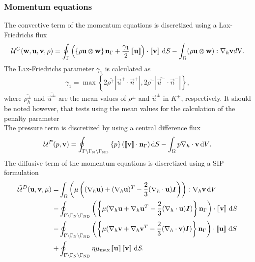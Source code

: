 \subsubsection{Momentum equations}
The convective term of the momentum equations is discretized using a Lax-Friedrichs flux
\begin{equation}
	\mathcal{U}^C(\textbf{w},\textbf{u},\textbf{v}, \rho)=  \oint_{\Gamma}{\left( \left\{{\rho\textbf{u}\otimes\textbf{w} }\right\}\textbf{n}_\Gamma + \frac{\gamma_1}{2}\left[\!\left[{{\textbf{u}}}\right]\!\right]\right)\cdot\left[\!\left[{{\textbf{v}}}\right]\!\right] \,\mathrm{d} S}
	-\int_{\Omega}({\rho\textbf{u}\otimes\textbf{w}}):\nabla_h\textbf{v} d\text{V}.
	\label{eq:Mom_convective}\\
\end{equation}
The Lax-Friedrichs parameter $\gamma_1$ is calculated as \textcite{kleinHighorderDiscontinuousGalerkin2016}
\begin{equation}
	\gamma_1  = \max \left\{2 \overline{\rho^+} |\overline{\vec{u}^+} \cdot \vec{n}^+|,2 \overline{\rho^-} |\overline{\vec{u}^-} \cdot \vec{n}^-|\right\},
	\label{eq:vardens_lambda}
\end{equation}
where $\overline{\rho_{h}^\pm}$ and $\overline{\vec{u}^\pm}$ are the mean values of $\rho^\pm$ and $\vec{u}^\pm$ in $K^\pm$, respectively. It should be noted however, that tests using the mean values for the calculation of the penalty parameter\\
The pressure term is discretized by using a central difference flux
\begin{equation}
	\mathcal{U}^P(p,\textbf{v})=  \oint_{\Gamma \setminus \Gamma_{\text{N}}\setminus \Gamma_{\text{ND}}}{ \left\{{p}\right\}(\left[\!\left[{{\textbf{v}}}\right]\!\right]\cdot \textbf{n}_\Gamma  )\,\mathrm{d} S}
	- \int_{\Omega}{p \nabla_h \cdot \textbf{v} \,\mathrm{d} V}. \label{eq:Mom_pressure}
\end{equation}
The diffusive term of the momentum equations is discretized using a \gls{SIP} formulation \parencite{shahbaziExplicitExpressionPenalty2005}
\begin{equation}
	\begin{aligned}
		\tilde{\mathcal{U}}^D(\vec{u},\vec{v},\mu) =
		  & \int_{\Omega}{\left(\mu\left((\nabla_h \vec{u}) + (\nabla_h \vec{u})^T - \frac{2}{3}(\nabla_h\cdot \vec{u})\mytensor{I} \right)\right)\colon \nabla_h\vec{v}} \dV \\
		- & \oint_{\Gamma \setminus \Gamma_{\text{N}}\setminus \Gamma_{\text{ND}}}
		\left(\mean{\mu(\nabla_h\vec{u} + \nabla_h\vec{u}^T - \frac{2}{3}(\nabla_h\cdot \vec{u})\mytensor{I})}\normalBoundary\right)\cdot\jump{\vec{v}}\dS                    \\
		- & \oint_{\Gamma \setminus \Gamma_{\text{N}}\setminus \Gamma_{\text{ND}}}
		\left(\mean{\mu(\nabla_h\vec{v} + \nabla_h\vec{v}^T - \frac{2}{3}(\nabla_h\cdot \vec{v})\mytensor{I})}\normalBoundary\right)\cdot\jump{\vec{u}} \dS                   \\
		+ & \oint_{\Gamma \setminus \Gamma_{\text{N}}\setminus \Gamma_{\text{ND}}} \eta \mu_{\text{max}} \jump{\vec{u}} \jump{\vec{v}}\dS.
		\label{eq:Mom_diffusive}
	\end{aligned}
\end{equation}
